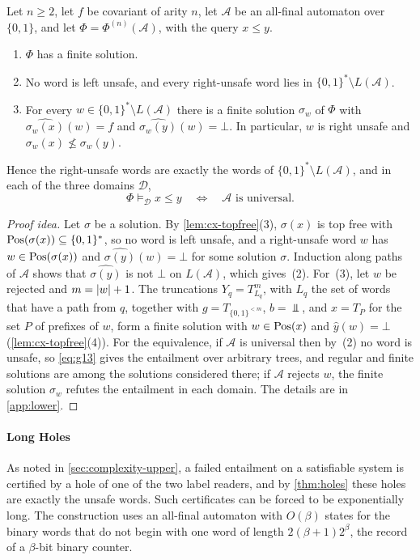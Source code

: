 \begin{lemma}\label{lem:cx-rejection}
Let $n\ge2$, let $f$ be covariant of arity $n$, let $\mathcal A$ be an
all-final automaton over $\{0,1\}$, and let $\Phi=\Phi^{(n)}(\mathcal A)$,
with the query $x\le y$.
\begin{enumerate}[leftmargin=*]
\item $\Phi$ has a finite solution.
\item No word is left unsafe, and every right-unsafe word lies in
  $\{0,1\}^*\setminus L(\mathcal A)$.
\item For every $w\in\{0,1\}^*\setminus L(\mathcal A)$ there is a finite
  solution $\sigma_w$ of $\Phi$ with $\widehat{\sigma_w(x)}(w)=f$ and
  $\widehat{\sigma_w(y)}(w)=\bot$. In particular, $w$ is right unsafe and
  $\sigma_w(x)\not\le\sigma_w(y)$.
\end{enumerate}
Hence the right-unsafe words are exactly the words of
$\{0,1\}^*\setminus L(\mathcal A)$, and in each of the three domains
$\mathcal D$,
\[
 \Phi\models_{\mathcal D}x\le y
 \quad\Longleftrightarrow\quad
 \mathcal A\text{ is universal}.
\]
\end{lemma}

\begin{proof}[Proof idea]
Let $\sigma$ be a solution. By \cref{lem:cx-topfree}(3), $\sigma(x)$ is top
free with $\operatorname{Pos}(\sigma(x))\subseteq\{0,1\}^*$, so no word is left unsafe, and
a right-unsafe word $w$ has $w\in\operatorname{Pos}(\sigma(x))$ and
$\widehat{\sigma(y)}(w)=\bot$ for some solution $\sigma$. Induction along
paths of $\mathcal A$ shows that $\widehat{\sigma(y)}$ is not $\bot$ on
$L(\mathcal A)$, which gives~(2). For~(3), let $w$ be rejected and
$m=\lvert w\rvert+1$. The truncations $Y_q=T_{L_q}^m$, with $L_q$ the set of words
that have a path from $q$, together with $g=T_{\{0,1\}^{<m}}$, $b=\Bot$, and
$x=T_P$ for the set $P$ of prefixes of $w$, form a finite solution with
$w\in\operatorname{Pos}(x)$ and $\widehat y(w)=\bot$ (\cref{lem:cx-topfree}(4)). For the
equivalence, if $\mathcal A$ is universal then by~(2) no word is unsafe, so
\eqref{eq:g13} gives the entailment over arbitrary trees, and regular and
finite solutions are among the solutions considered there; if $\mathcal A$
rejects $w$, the finite solution $\sigma_w$ refutes the entailment in each
domain. The details are in \cref{app:lower}.
\end{proof}

\paragraph{Long Holes}
As noted in \cref{sec:complexity-upper}, a failed entailment on a
satisfiable system is certified by a hole of one of the two label readers,
and by \cref{thm:holes} these holes are exactly the unsafe words. Such
certificates can be forced to be exponentially long. The construction uses
an all-final automaton with $O(\beta)$ states for the binary words that do
not begin with one word of length $2(\beta+1)2^\beta$, the record of a
$\beta$-bit binary counter.

